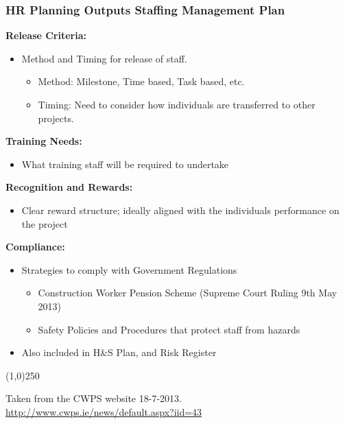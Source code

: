  
\begin{frame}
\frametitle{HR Planning Outputs \hfill Staffing Management Plan}
\textbf{Release Criteria:}
		\begin{itemize}
			\item Method and Timing for release of staff.
		\begin{itemize}
			\item Method: Milestone, Time based, Task based, etc.
			\item Timing: Need to consider how individuals are transferred to other projects.
		\end{itemize}
		\end{itemize}
\textbf{Training Needs:}
		\begin{itemize}
			\item  	What training staff will be required to undertake
		\end{itemize}
\textbf{Recognition and Rewards:}
		\begin{itemize}
			\item  	Clear reward structure; ideally aligned with the individuals  performance on the project
		\end{itemize}
\textbf{Compliance:}
\begin{itemize}
	\item Strategies to comply with Government Regulations
			\begin{itemize}
				\item Construction Worker Pension Scheme (Supreme Court Ruling 9th May 2013)
			  	\item Safety Policies and Procedures that protect staff from hazards
			\end{itemize}
 	\item Also included in H\&S Plan, and Risk Register
\end{itemize}
\end{frame}\begin{center}\line(1,0){250}\end{center}

Taken from the CWPS website 18-7-2013.\\ 
\href{http://www.cwps.ie/news/default.aspx?iid=43}{http://www.cwps.ie/news/default.aspx?iid=43}

